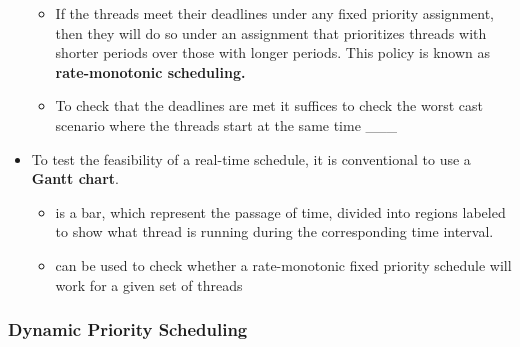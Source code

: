 \documentclass[11pt]{article}
\providecommand{\tightlist}{%
      \setlength{\itemsep}{0pt}\setlength{\parskip}{0pt}}
\begin{document}
\begin{itemize}
  \begin{itemize}
  \tightlist
  \item
    If the threads meet their deadlines under any fixed priority
    assignment, then they will do so under an assignment that
    prioritizes threads with shorter periods over those with longer
    periods. This policy is known as \textbf{rate-monotonic scheduling.}
  \item
    To check that the deadlines are met it suffices to check the worst
    cast scenario where the threads start at the same time \_\_\_
  \end{itemize}
\item
  To test the feasibility of a real-time schedule, it is conventional to
  use a \textbf{Gantt chart}.

  \begin{itemize}
  \tightlist
  \item
    is a bar, which represent the passage of time, divided into regions
    labeled to show what thread is running during the corresponding time
    interval.
  \item
    can be used to check whether a rate-monotonic fixed priority
    schedule will work for a given set of threads
  \end{itemize}
\end{itemize}

    \subsubsection{Dynamic Priority
Scheduling}\label{dynamic-priority-scheduling}
\end{document}
